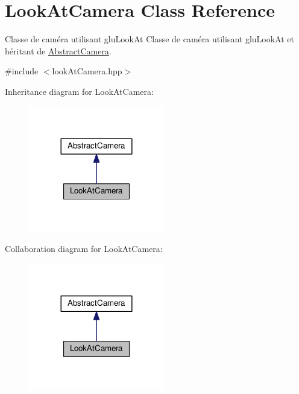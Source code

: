 \hypertarget{class_look_at_camera}{\section{Look\+At\+Camera Class Reference}
\label{class_look_at_camera}
}


Classe de caméra utilisant glu\+Look\+At Classe de caméra utilisant glu\+Look\+At et héritant de \hyperlink{class_abstract_camera}{Abstract\+Camera}.  




{\ttfamily \#include $<$look\+At\+Camera.\+hpp$>$}



Inheritance diagram for Look\+At\+Camera\+:
\nopagebreak
\begin{figure}[H]
\begin{center}
\leavevmode
\includegraphics[width=168pt]{class_look_at_camera__inherit__graph}
\end{center}
\end{figure}


Collaboration diagram for Look\+At\+Camera\+:
\nopagebreak
\begin{figure}[H]
\begin{center}
\leavevmode
\includegraphics[width=168pt]{class_look_at_camera__coll__graph}
\end{center}
\end{figure}
